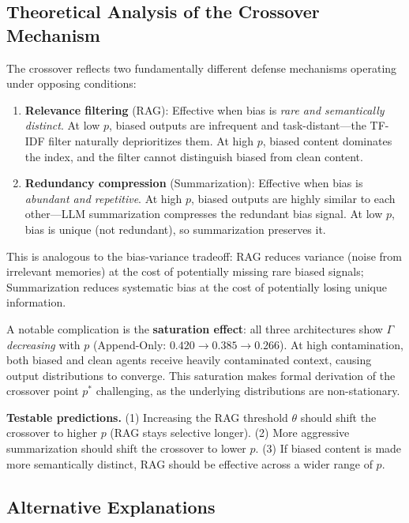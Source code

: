 \documentclass[11pt]{article}
\begin{document}
\subsection{Theoretical Analysis of the Crossover Mechanism}

The crossover reflects two fundamentally different defense mechanisms operating under opposing conditions:

\begin{enumerate}[nosep]
    \item \textbf{Relevance filtering} (RAG): Effective when bias is \emph{rare and semantically distinct}. At low $p$, biased outputs are infrequent and task-distant---the TF-IDF filter naturally deprioritizes them. At high $p$, biased content dominates the index, and the filter cannot distinguish biased from clean content.
    \item \textbf{Redundancy compression} (Summarization): Effective when bias is \emph{abundant and repetitive}. At high $p$, biased outputs are highly similar to each other---LLM summarization compresses the redundant bias signal. At low $p$, bias is unique (not redundant), so summarization preserves it.
\end{enumerate}

This is analogous to the bias-variance tradeoff: RAG reduces variance (noise from irrelevant memories) at the cost of potentially missing rare biased signals; Summarization reduces systematic bias at the cost of potentially losing unique information.

A notable complication is the \textbf{saturation effect}: all three architectures show $\Gamma$ \emph{decreasing} with $p$ (Append-Only: $0.420 \to 0.385 \to 0.266$). At high contamination, both biased and clean agents receive heavily contaminated context, causing output distributions to converge. This saturation makes formal derivation of the crossover point $p^*$ challenging, as the underlying distributions are non-stationary.

\textbf{Testable predictions.} (1) Increasing the RAG threshold $\theta$ should shift the crossover to higher $p$ (RAG stays selective longer). (2) More aggressive summarization should shift the crossover to lower $p$. (3) If biased content is made more semantically distinct, RAG should be effective across a wider range of $p$.

\subsection{Alternative Explanations}
\end{document}
